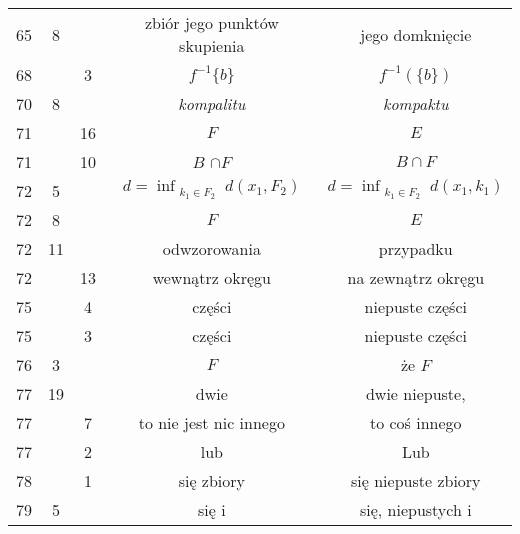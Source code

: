 \documentclass[a4paper,11pt]{article}
\begin{document}
\begin{center}
\begin{tabular}{|c|c|c|c|c|}
    65  &  8 & & zbiór jego punktów skupienia & jego domknięcie \\
    68  & &  3 & $f^{ -1 } \{ b \}$ & $f^{ -1 }( \{ b \} )$ \\
    70  &  8 & & \textit{kompalitu} & \textit{kompaktu} \\
    71  & & 16 & $F$ & $E$ \\
    71  & & 10 & $B$ $\cap F$ & $B \cap F$ \\
    72  &  5 & & $d = \inf_{ \substack{ k_{ 1 } \in F_{ 2 } } }
                 d( x_{ 1 }, F_{ 2 } )$
           & $d = \inf_{ \substack{ k_{ 1 } \in F_{ 2 } } }
             d( x_{ 1 }, k_{ 1 } )$ \\
    72  &  8 & & $F$ & $E$ \\
    72  & 11 & & odwzorowania & przypadku \\
    72  & & 13 & wewnątrz okręgu & na zewnątrz okręgu \\
    75  & &  4 & części & niepuste części \\
    75  & &  3 & części & niepuste części \\
    76  &  3 & & $F$ & że $F$ \\
    77  & 19 & & dwie & dwie niepuste, \\
    77  & &  7 & to nie jest nic innego & to coś innego \\
    77  & &  2 & lub & Lub \\
    78  & &  1 & się zbiory & się niepuste zbiory \\
    79  &  5 & & się i & się, niepustych i \\
    \hline
  \end{tabular}

\end{center}
\end{document}
